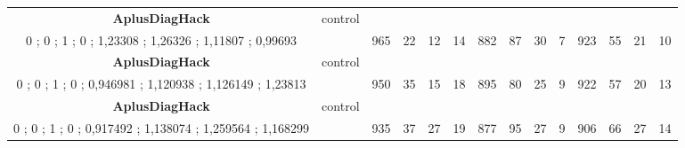 \begin{table}[H]
{\begin{tabular}{|c|c|c|c|c|c|c|c|c|c|c|c|c|c|}
\cellcolor{blue!15}\textbf{AplusDiagHack} & control& {\color[HTML]{00009B} } & {\color[HTML]{9A0000} } & {\color[HTML]{009901} } &  & {\color[HTML]{00009B} } & {\color[HTML]{9A0000} } & {\color[HTML]{009901} } &  & {\color[HTML]{00009B} } & {\color[HTML]{9A0000} } & {\color[HTML]{009901} } &  \\ 
\cellcolor{ blue!15}0 ; 0 ; 1 ; 0 ; 1,23308 ; 1,26326 ; 1,11807 ; 0,99693 &  & \multirow{-2}{*}{{\color[HTML]{00009B} 965}} & \multirow{-2}{*}{{\color[HTML]{9A0000} 22}} & \multirow{-2}{*}{{\color[HTML]{009901} 12}} & \multirow{-2}{*}{14} & \multirow{-2}{*}{{\color[HTML]{00009B} 882}} & \multirow{-2}{*}{{\color[HTML]{9A0000} 87}} & \multirow{-2}{*}{{\color[HTML]{009901} 30}} & \multirow{-2}{*}{7} & \multirow{-2}{*}{{\color[HTML]{00009B} 923}} & \multirow{-2}{*}{{\color[HTML]{9A0000} 55}} & \multirow{-2}{*}{{\color[HTML]{009901} 21}} & \multirow{-2}{*}{10} \\ \hline

\cellcolor{blue!15}\textbf{AplusDiagHack} & control& {\color[HTML]{00009B} } & {\color[HTML]{9A0000} } & {\color[HTML]{009901} } &  & {\color[HTML]{00009B} } & {\color[HTML]{9A0000} } & {\color[HTML]{009901} } &  & {\color[HTML]{00009B} } & {\color[HTML]{9A0000} } & {\color[HTML]{009901} } &  \\ 
\cellcolor{ blue!15}0 ; 0 ; 1 ; 0 ; 0,946981 ; 1,120938 ; 1,126149 ; 1,23813 &  & \multirow{-2}{*}{{\color[HTML]{00009B} 950}} & \multirow{-2}{*}{{\color[HTML]{9A0000} 35}} & \multirow{-2}{*}{{\color[HTML]{009901} 15}} & \multirow{-2}{*}{18} & \multirow{-2}{*}{{\color[HTML]{00009B} 895}} & \multirow{-2}{*}{{\color[HTML]{9A0000} 80}} & \multirow{-2}{*}{{\color[HTML]{009901} 25}} & \multirow{-2}{*}{9} & \multirow{-2}{*}{{\color[HTML]{00009B} 922}} & \multirow{-2}{*}{{\color[HTML]{9A0000} 57}} & \multirow{-2}{*}{{\color[HTML]{009901} 20}} & \multirow{-2}{*}{13} \\ \hline

\cellcolor{blue!15}\textbf{AplusDiagHack} & control& {\color[HTML]{00009B} } & {\color[HTML]{9A0000} } & {\color[HTML]{009901} } &  & {\color[HTML]{00009B} } & {\color[HTML]{9A0000} } & {\color[HTML]{009901} } &  & {\color[HTML]{00009B} } & {\color[HTML]{9A0000} } & {\color[HTML]{009901} } &  \\ 
\cellcolor{ blue!15}0 ; 0 ; 1 ; 0 ; 0,917492 ; 1,138074 ; 1,259564 ; 1,168299 &  & \multirow{-2}{*}{{\color[HTML]{00009B} 935}} & \multirow{-2}{*}{{\color[HTML]{9A0000} 37}} & \multirow{-2}{*}{{\color[HTML]{009901} 27}} & \multirow{-2}{*}{19} & \multirow{-2}{*}{{\color[HTML]{00009B} 877}} & \multirow{-2}{*}{{\color[HTML]{9A0000} 95}} & \multirow{-2}{*}{{\color[HTML]{009901} 27}} & \multirow{-2}{*}{9} & \multirow{-2}{*}{{\color[HTML]{00009B} 906}} & \multirow{-2}{*}{{\color[HTML]{9A0000} 66}} & \multirow{-2}{*}{{\color[HTML]{009901} 27}} & \multirow{-2}{*}{14} \\ \hline


\end{tabular}}
\end{table}
